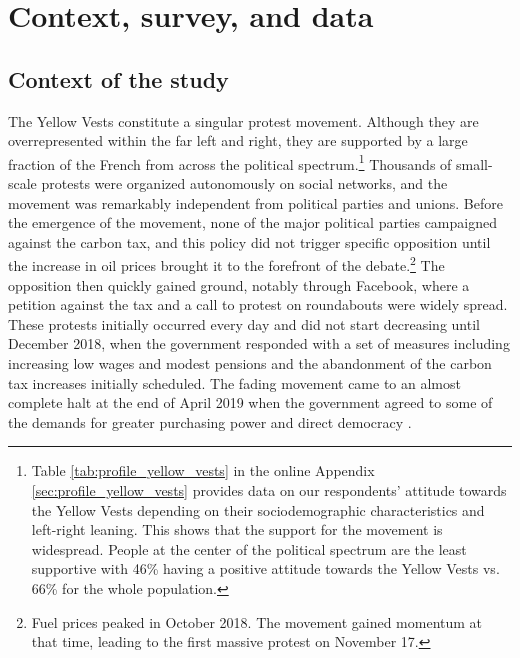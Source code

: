 \documentclass[12pt]{article} %
\begin{document}
\section{Context, survey, and data} \label{sec:survey}

\subsection{Context of the study \label{subsec:context}}



The Yellow Vests constitute a singular protest movement. Although they are overrepresented within the far left and right, they are supported by a large fraction of the French from across the political spectrum.\footnote{Table \ref{tab:profile_yellow_vests} in the online Appendix \ref{sec:profile_yellow_vests} provides data on our respondents' attitude towards the Yellow Vests depending on their sociodemographic characteristics and left-right leaning. This shows that the support for the movement is widespread. People at the center of the political spectrum are the least supportive with 46\% having a positive attitude towards the Yellow Vests vs. 66\% for the whole population.} Thousands of small-scale protests were organized autonomously on social networks, and the movement was remarkably independent from political parties and unions. Before the emergence of the movement, none of the major political parties campaigned against the carbon tax, and this policy did not trigger specific opposition until the increase in oil prices brought it to the forefront of the debate.\footnote{Fuel prices peaked in October 2018. The movement gained momentum at that time, leading to the first massive protest on November 17.} The opposition then quickly gained ground, notably through Facebook, where a petition against the tax and a call to protest on roundabouts were widely spread. These protests initially occurred every day and did not start decreasing until December 2018, when the government responded with a set of measures including increasing low wages and modest pensions and the abandonment of the carbon tax increases initially scheduled. The fading movement came to an almost complete halt at the end of April 2019 when the government agreed to some of the demands for greater purchasing power and direct democracy \citep{boyer_les_2020}.
\end{document}
